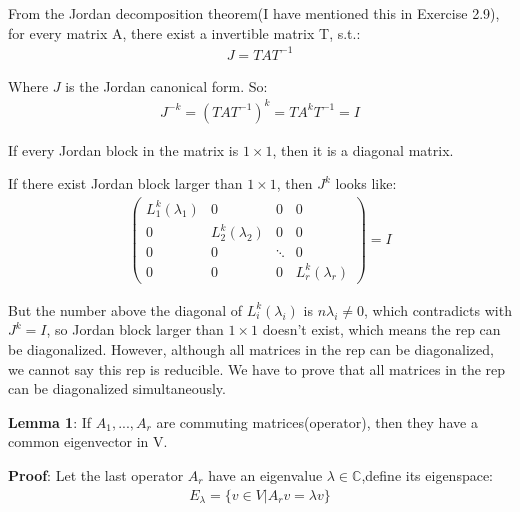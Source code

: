 \documentclass[]{ctexart}
\begin{document}
			From the Jordan decomposition theorem(I have mentioned this in Exercise 2.9), for every matrix A, there exist a invertible matrix T, s.t.:
				\begin{equation*}
				\begin{aligned}
					J=TAT^{-1}
				\end{aligned}
				\end{equation*}
				
			Where $J$ is the Jordan canonical form. So:
				\begin{equation*}
				\begin{aligned}
					J^{-k}=(TAT^{-1})^{k}=TA^{k}T^{-1}=I
				\end{aligned}
				\end{equation*}
			
			If every Jordan block in the matrix is  $1\times 1$, then it is a diagonal matrix. 
			
			If there exist Jordan block larger than $1\times 1$, then $J^k$ looks like:
				\begin{equation*}
				\begin{aligned}
					\begin{pmatrix}
					L_{1}^k(\lambda_1)&0&0&0\\
					0&L_{2}^k(\lambda_2)&0&0\\
					0&0&\ddots          &0\\
					0&0&0&L_{r}^k(\lambda_r) 
					\end{pmatrix}=I
				\end{aligned}
				\end{equation*}
		
			But the number above the diagonal of $L_{i}^k(\lambda_i)$ is $n\lambda_i \ne 0$, which contradicts with $J^k=I$, so Jordan block larger than $1\times 1$ doesn't exist, which means the rep can be diagonalized. However, although all matrices in the rep can be diagonalized, we cannot say this rep is reducible. We have to prove that all matrices in the rep can be diagonalized simultaneously. 
		
			\textbf{Lemma 1}: If $A_1,...,A_r$ are commuting  matrices(operator), then they have a common eigenvector in V. 
		
			\textbf{Proof}: Let the last operator $A_r$ have an eigenvalue $\lambda\in \mathbb{C}$,define its eigenspace:
			\begin{equation*}
			\begin{aligned}
				E_{\lambda}=\{v\in V|A_rv=\lambda v\}
			\end{aligned}
			\end{equation*}
		
\end{document}
